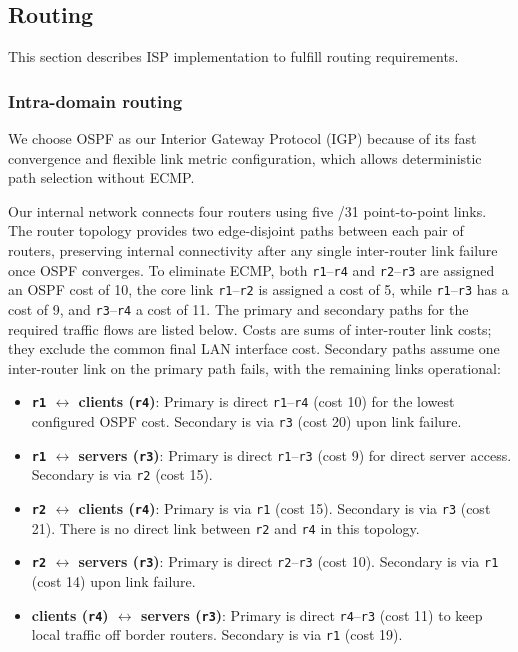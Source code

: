\documentclass{article}
\begin{document}
\subsection{Routing}
This section describes ISP implementation to fulfill routing requirements.

\subsubsection{Intra-domain routing}
We choose OSPF as our Interior Gateway Protocol (IGP) because of its fast convergence and flexible link metric configuration, which allows deterministic path selection without ECMP.

Our internal network connects four routers using five /31 point-to-point links. The router topology provides two edge-disjoint paths between each pair of routers, preserving internal connectivity after any single inter-router link failure once OSPF converges. To eliminate ECMP, both \texttt{r1}--\texttt{r4} and \texttt{r2}--\texttt{r3} are assigned an OSPF cost of 10, the core link \texttt{r1}--\texttt{r2} is assigned a cost of 5, while \texttt{r1}--\texttt{r3} has a cost of 9, and \texttt{r3}--\texttt{r4} a cost of 11.
The primary and secondary paths for the required traffic flows are listed below. Costs are sums of inter-router link costs; they exclude the common final LAN interface cost. Secondary paths assume one inter-router link on the primary path fails, with the remaining links operational:
\begin{itemize}
    \item \textbf{\texttt{r1} $\leftrightarrow$ clients (\texttt{r4})}: Primary is direct \texttt{r1}--\texttt{r4} (cost 10) for the lowest configured OSPF cost. Secondary is via \texttt{r3} (cost 20) upon link failure.
    
    \item \textbf{\texttt{r1} $\leftrightarrow$ servers (\texttt{r3})}: Primary is direct \texttt{r1}--\texttt{r3} (cost 9) for direct server access. Secondary is via \texttt{r2} (cost 15).
    
    \item \textbf{\texttt{r2} $\leftrightarrow$ clients (\texttt{r4})}: Primary is via \texttt{r1} (cost 15). Secondary is via \texttt{r3} (cost 21). There is no direct link between \texttt{r2} and \texttt{r4} in this topology.
    
    \item \textbf{\texttt{r2} $\leftrightarrow$ servers (\texttt{r3})}: Primary is direct \texttt{r2}--\texttt{r3} (cost 10). Secondary is via \texttt{r1} (cost 14) upon link failure.
    
    \item \textbf{clients (\texttt{r4}) $\leftrightarrow$ servers (\texttt{r3})}: Primary is direct \texttt{r4}--\texttt{r3} (cost 11) to keep local traffic off border routers. Secondary is via \texttt{r1} (cost 19).
\end{itemize}
\end{document}
